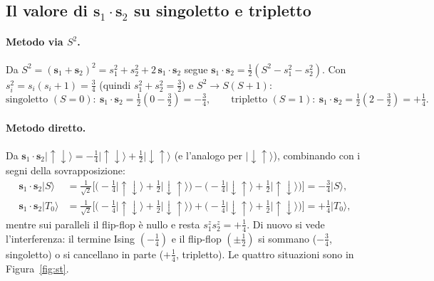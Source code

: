 \documentclass[11pt,a4paper]{article}
\newcommand{\ket}[1]{\lvert #1 \rangle}
\newcommand{\up}{\uparrow}
\newcommand{\dn}{\downarrow}
\renewcommand{\vec}[1]{\boldsymbol{#1}}
\newcommand{\sv}{\vec{s}}
\theoremstyle{definition}
\theoremstyle{remark}
\begin{document}
\subsection{Il valore di $\sv_1\!\cdot\sv_2$ su singoletto e tripletto}
\label{sub:s1s2}

\paragraph{Metodo via $S^2$.} Da $S^2=(\sv_1+\sv_2)^2=s_1^2+s_2^2+2\,\sv_1\!\cdot\sv_2$ segue
$\sv_1\!\cdot\sv_2=\tfrac12(S^2-s_1^2-s_2^2)$. Con $s_i^2=s_i(s_i+1)=\tfrac34$ (quindi $s_1^2+s_2^2=\tfrac32$)
e $S^2\to S(S+1)$:
\begin{equation}
\text{singoletto }(S=0):\ \sv_1\!\cdot\sv_2=\tfrac12(0-\tfrac32)=-\tfrac34,\qquad
\text{tripletto }(S=1):\ \sv_1\!\cdot\sv_2=\tfrac12(2-\tfrac32)=+\tfrac14 .
\end{equation}

\paragraph{Metodo diretto.} Da $\sv_1\!\cdot\sv_2\ket{\up\dn}=-\tfrac14\ket{\up\dn}+\tfrac12\ket{\dn\up}$
(e l'analogo per $\ket{\dn\up}$), combinando con i segni della sovrapposizione:
\begin{align}
\sv_1\!\cdot\sv_2\ket{S}
&=\tfrac1{\sqrt2}\Big[\big(-\tfrac14\ket{\up\dn}+\tfrac12\ket{\dn\up}\big)-\big(-\tfrac14\ket{\dn\up}+\tfrac12\ket{\up\dn}\big)\Big]
=-\tfrac34\ket{S},\\
\sv_1\!\cdot\sv_2\ket{T_0}
&=\tfrac1{\sqrt2}\Big[\big(-\tfrac14\ket{\up\dn}+\tfrac12\ket{\dn\up}\big)+\big(-\tfrac14\ket{\dn\up}+\tfrac12\ket{\up\dn}\big)\Big]
=+\tfrac14\ket{T_0},
\end{align}
mentre sui paralleli il flip-flop è nullo e resta $s_1^zs_2^z=+\tfrac14$. Di nuovo si vede l'interferenza:
il termine Ising $(-\tfrac14)$ e il flip-flop $(\pm\tfrac12)$ si sommano ($-\tfrac34$, singoletto) o si
cancellano in parte ($+\tfrac14$, tripletto). Le quattro situazioni sono in Figura~\ref{fig:st}.
\end{document}
